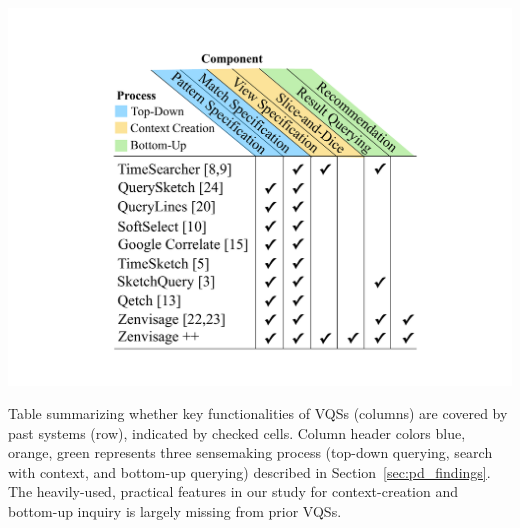 \begin{table}
		\centering
    \includegraphics[width=0.8\linewidth]{figures/related_works_table.pdf}
    \caption{Table summarizing whether key functionalities of VQSs (columns) are covered by past systems (row), indicated by checked cells. Column header colors blue, orange, green represents three sensemaking process (top-down querying, search with context, and bottom-up querying) described in Section~\ref{sec:pd_findings}. The heavily-used, practical features in our study for context-creation and bottom-up inquiry is largely missing from prior VQSs.}
    \label{table:relatedwork}
    \vspace{-10pt}
\end{table}
